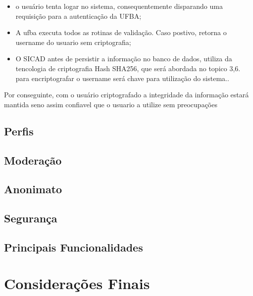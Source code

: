 \documentclass[12pt, a4paper]{report}
\begin{document}
\begin{itemize}
\item o usuário tenta logar no sistema, consequentemente disparando uma requisição para a autenticação da UFBA;
\item A ufba executa todos as rotinas de validação.
Caso postivo, retorna o username do usuario sem criptografia;
\item O SICAD antes de persistir a informação  no banco de dados, utiliza da tencologia de criptografia Hash SHA256, que será abordada no topico 3,6. para encriptografar o username será chave para utilização do sistema..
\end{itemize}
\par Por conseguinte, com o usuário criptografado a integridade da informação estará mantida seno assim confiavel que o usuario a utilize sem preocupações

\section{ Perfis}
\par
\section{ Moderação}
\section{ Anonimato}
\section{ Segurança}
\section{ Principais Funcionalidades}

\chapter{Considerações Finais}


\renewcommand\bibname{Referências}


\nocite{*}

\appendix
\end{document}
